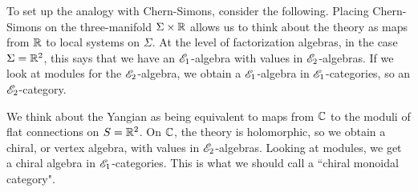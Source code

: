 \documentclass[10pt]{amsart}
\begin{document}
To set up the analogy with Chern-Simons, consider the following. 
Placing Chern-Simons on the three-manifold $\Sigma \times \mathbb R$ allows us to think about the theory as maps from $\mathbb R$ to local systems on $\Sigma$. 
At the level of factorization algebras, in the case $\Sigma = \mathbb R^2$, this says that we have an $\mathscr E_1$-algebra with values in $\mathscr E_2$-algebras.
If we look at modules for the $\mathscr E_2$-algebra, we obtain a $\mathscr E_1$-algebra in $\mathscr E_1$-categories, so an $\mathscr E_2$-category.

We think about the Yangian as being equivalent to maps from $\mathbb C$ to the moduli of flat connections on $S = \mathbb R^2$.
On $\mathbb C$, the theory is holomorphic, so we obtain a chiral, or vertex algebra, with values in $\mathscr E_2$-algebras. 
Looking at modules, we get a chiral algebra in $\mathscr E_1$-categories. 
This is what we should call a ``chiral monoidal category". 
 
%

%  

\end{document}
